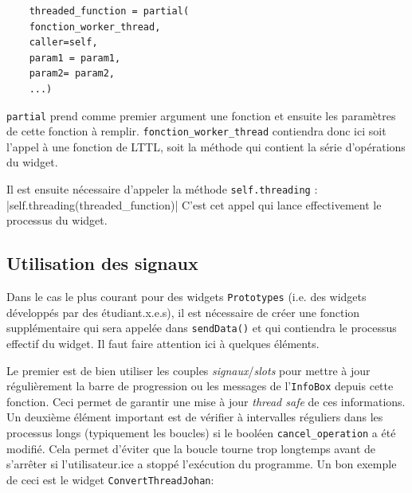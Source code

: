 \documentclass{article}
\begin{document}
\begin{verbatim}
    threaded_function = partial(
    fonction_worker_thread,
    caller=self,
    param1 = param1,
    param2= param2,
    ...)
\end{verbatim}

\texttt{partial} prend comme premier argument une fonction et ensuite les paramètres de cette fonction à remplir. \texttt{fonction\_worker\_thread} contiendra donc ici soit l'appel à une fonction de LTTL, soit la méthode qui contient la série d'opérations du widget.

Il est ensuite nécessaire d'appeler la méthode \texttt{self.threading} :
|self.threading(threaded_function)|
C'est cet appel qui lance effectivement le processus du widget.

\subsection{Utilisation des signaux}

Dans le cas le plus courant pour des widgets \texttt{Prototypes} (i.e. des widgets développés par des étudiant.x.e.s), il est nécessaire de créer une fonction supplémentaire qui sera appelée dans \texttt{sendData()} et qui contiendra le processus effectif du widget. Il faut faire attention ici à quelques éléments.

Le premier est de bien utiliser les couples \textit{signaux}/\textit{slots} pour mettre à jour régulièrement la barre de progression ou les messages de l'\texttt{InfoBox} depuis cette fonction. Ceci permet de garantir une mise à jour \textit{thread safe} de ces informations. 
Un deuxième élément important est de vérifier à intervalles réguliers dans les processus longs (typiquement les boucles) si le booléen \texttt{cancel\_operation} a été modifié. Cela permet d'éviter que la boucle tourne trop longtemps avant de s'arrêter si l'utilisateur.ice a stoppé l'exécution du programme. Un bon exemple de ceci est le widget \texttt{ConvertThreadJohan}:
\end{document}
